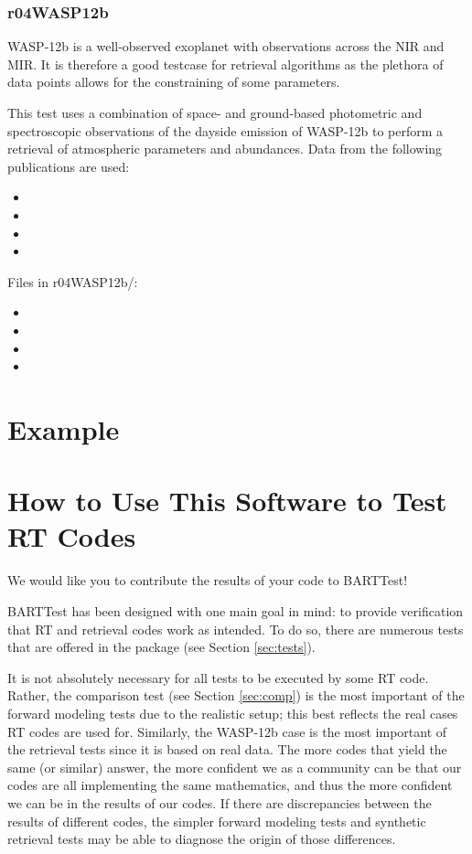 \documentclass[letterpaper, 12pt]{article}
\begin{document}
\subsubsection{r04WASP12b}
WASP-12b is a well-observed exoplanet with observations across the NIR and MIR. 
It is therefore a good testcase for retrieval algorithms as the plethora of 
data points allows for the constraining of some parameters. 

This test uses a combination of space- and ground-based photometric and 
spectroscopic observations of the 
dayside emission of WASP-12b to perform a retrieval of atmospheric parameters 
and abundances. Data from the following publications are used:
\begin{itemize} \itemsep0pt
  \item 
  \item 
  \item 
  \item 
\end{itemize}

Files in r04WASP12b/:
\begin{itemize} \itemsep0pt
  \item 
  \item 
  \item 
  \item 
\end{itemize}


\section{Example}
\label{sec:example}


\section{How to Use This Software to Test RT Codes}
\label{sec:howto}
We would like you to contribute the results of your code to BARTTest! 

BARTTest has been designed with one main goal in mind: to provide verification 
that RT and retrieval codes work as intended. To do so, there are numerous 
tests that are offered in the package (see Section \ref{sec:tests}).

It is not absolutely necessary for all tests to be executed by some RT code. 
Rather, the comparison test (see Section \ref{sec:comp}) is the most important 
of the forward modeling tests due to the realistic setup; this best reflects 
the real cases RT codes are used for. Similarly, the WASP-12b case is the most 
important of the retrieval tests since it is based on real data. The more 
codes that yield the same (or similar) answer, the more confident we as a 
community can be that our codes are all implementing the same mathematics, 
and thus the more confident we can be in the results of our codes. If there 
are discrepancies between the results of different codes, the simpler forward 
modeling tests and synthetic retrieval tests may be able to diagnose the origin 
of those differences.
\end{document}
